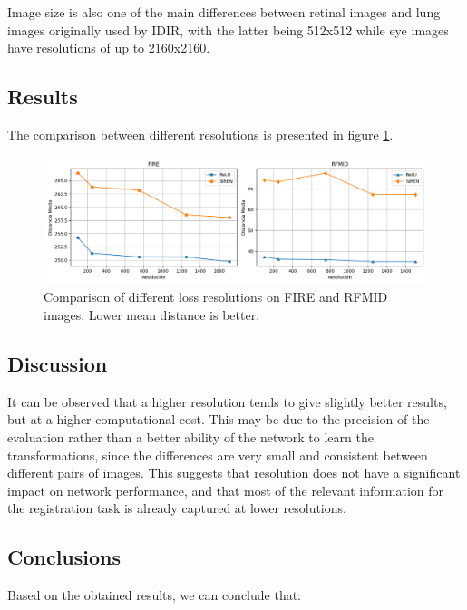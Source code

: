 Image size is also one of the main differences between retinal images and lung images originally used by IDIR, with the latter being 512x512 while eye images have resolutions of up to 2160x2160.

\subsection{Results}\label{subsec:Resultados-resolution}

The comparison between different resolutions is presented in figure \ref{fig:resoluciónchart}.

\begin{figure}[tbp]
    \centering
    \includegraphics[width=1\textwidth]{imaxes/resolutionchart.png}
    \caption{Comparison of different loss resolutions on FIRE and RFMID images. Lower mean distance is better.}
    \label{fig:resoluciónchart}
\end{figure}

\subsection{Discussion}
\label{subsec:Discusion-resolution}

It can be observed that a higher resolution tends to give slightly better results, but at a higher computational cost.
This may be due to the precision of the evaluation rather than a better ability of the network to learn the transformations, since the differences are very small and consistent between different pairs of images.
This suggests that resolution does not have a significant impact on network performance, and that most of the relevant information for the registration task is already captured at lower resolutions.

\subsection{Conclusions}
\label{subsec:Conclusions-resolution}

Based on the obtained results, we can conclude that:


